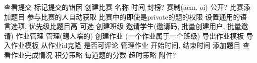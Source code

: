 {}\markdownRendererUlBeginTight
\markdownRendererUlItem 查看提交\markdownRendererUlItemEnd 
\markdownRendererUlItem 标记提交的错因\markdownRendererUlItemEnd 
\markdownRendererUlEndTight \markdownRendererInterblockSeparator
{}\markdownRendererInterblockSeparator
{}\markdownRendererUlBeginTight
\markdownRendererUlItem 创建比赛\markdownRendererUlItemEnd 
\markdownRendererUlItem 名称\markdownRendererUlItemEnd 
\markdownRendererUlItem 时间\markdownRendererUlItemEnd 
\markdownRendererUlItem 封榜?\markdownRendererUlItemEnd 
\markdownRendererUlItem 赛制(acm, oi)\markdownRendererUlItemEnd 
\markdownRendererUlItem {}\markdownRendererUlItemEnd 
\markdownRendererUlItem 公开?\markdownRendererUlItemEnd 
\markdownRendererUlItem 比赛添加题目\markdownRendererUlItemEnd 
\markdownRendererUlItem 参与比赛的人自动获取 比赛中的即使是private的题的权限\markdownRendererUlItemEnd 
\markdownRendererUlItem 设置通用的语言选项, 优先级比题目高  可选\markdownRendererUlItemEnd 
\markdownRendererUlEndTight \markdownRendererInterblockSeparator
{}\markdownRendererInterblockSeparator
{}\markdownRendererUlBeginTight
\markdownRendererUlItem 创建班级\markdownRendererUlItemEnd 
\markdownRendererUlItem 邀请学生(邀请码, 批量创建用户, 批量邀请)\markdownRendererUlItemEnd 
\markdownRendererUlItem 作业管理\markdownRendererUlItemEnd 
\markdownRendererUlItem 管理(踢人啥的)\markdownRendererUlItemEnd 
\markdownRendererUlEndTight \markdownRendererInterblockSeparator
{}\markdownRendererInterblockSeparator
{}\markdownRendererUlBeginTight
\markdownRendererUlItem 创建作业 (一个作业属于一个班级)\markdownRendererUlItemEnd 
\markdownRendererUlItem 导出作业模板\markdownRendererUlItemEnd 
\markdownRendererUlItem 导入作业模板\markdownRendererUlItemEnd 
\markdownRendererUlItem 从作业id克隆\markdownRendererUlItemEnd 
\markdownRendererUlItem 是否可评论\markdownRendererUlItemEnd 
\markdownRendererUlItem 管理作业\markdownRendererUlItemEnd 
\markdownRendererUlItem 开始时间, 结束时间\markdownRendererUlItemEnd 
\markdownRendererUlItem 添加题目\markdownRendererUlItemEnd 
\markdownRendererUlItem 查看作业完成情况\markdownRendererUlItemEnd 
\markdownRendererUlItem 积分策略\markdownRendererUlItemEnd 
\markdownRendererUlItem 每道题的分数\markdownRendererUlItemEnd 
\markdownRendererUlItem 超时策略\markdownRendererUlItemEnd 
\markdownRendererUlItem 附件?\markdownRendererUlItemEnd 
\markdownRendererUlEndTight \markdownRendererInterblockSeparator
